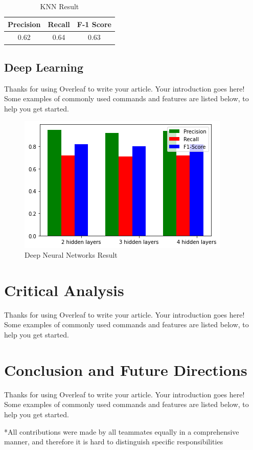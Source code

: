 \documentclass[fleqn,11pt]{olplainarticle}
\begin{document}
\begin{table}[!htbp]
\centering
\caption{KNN Result}\label{tab:knn}
\begin{tabular}{ccc}
\toprule
Precision& Recall& F-1 Score\\
\midrule
0.62& 0.64& 0.63\\
\bottomrule
\end{tabular}
\end{table}



\subsection{Deep Learning}\label{dnn}
Thanks for using Overleaf to write your article. Your introduction goes here! Some examples of commonly used commands and features are listed below, to help you get started.
\begin{figure}[H]
	\centering
	\includegraphics[scale=0.5]{result.png}
	\caption{Deep Neural Networks Result}
	\label{fig:res}
\end{figure}


\section{Critical Analysis}\label{analysis}
Thanks for using Overleaf to write your article. Your introduction goes here! Some examples of commonly used commands and features are listed below, to help you get started.

\section{Conclusion and Future Directions}\label{conclu}
Thanks for using Overleaf to write your article. Your introduction goes here! Some examples of commonly used commands and features are listed below, to help you get started.



\small{*All contributions were made by all teammates equally in a comprehensive manner, and therefore it is hard to distinguish specific responsibilities}
\end{document}
